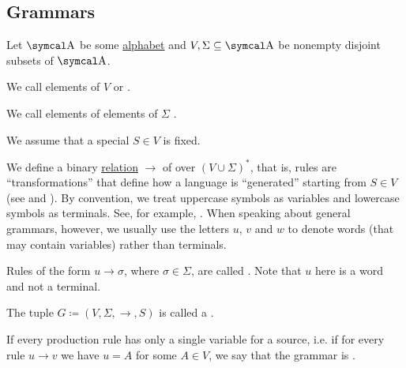 \subsection{Grammars}\label{subsec:grammars}

\begin{definition}\label{def:grammar}
  Let \( \CA \) be some \hyperref[def:language/alphabet]{alphabet} and \( V, \Sigma \subseteq \CA \) be nonempty disjoint subsets of \( \CA \).

  \begin{DefEnum}
     We call elements of \( V \)  or .

     We call elements of elements of \( \Sigma \) .

     We assume that a special  \( S \in V \) is fixed.

     We define a binary \hyperref[def:relation]{relation} \( \to \) of  over \( (V \cup \Sigma)^* \), that is, rules are \enquote{transformations} that define how a language is \enquote{generated} starting from \( S \in V \) (see  and ). By convention, we treat uppercase symbols as variables and lowercase symbols as terminals. See, for example, . When speaking about general grammars, however, we usually use the letters \( u \), \( v \) and \( w \) to denote words (that may contain variables) rather than terminals.

     Rules of the form \( u \to \sigma \), where \( \sigma \in \Sigma \), are called . Note that \( u \) here is a word and not a terminal.

     The tuple \( G \coloneqq (V, \Sigma, \to, S) \) is called a .

     If every production rule has only a single variable for a source, i.e. if for every rule \( u \to v \) we have \( u = A \) for some \( A \in V \), we say that the grammar is .
  \end{DefEnum}
\end{definition}

